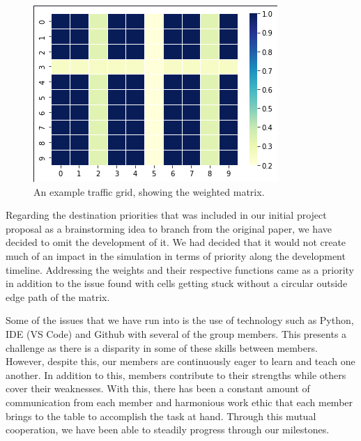 \documentclass[sigplan,screen]{acmart}
\begin{document}
\begin{figure}[h]
    \centering
    \includegraphics[width=\columnwidth]{assets/wmatrix.png}
    \caption{An example traffic grid, showing the weighted matrix.}
    \label{fig:wmatrix}
\end{figure}

Regarding the destination priorities that was included in our initial project
proposal as a brainstorming idea to branch from the original paper, we have
decided to omit the development of it. We had decided that it would not create
much of an impact in the simulation in terms of priority along the development
timeline. Addressing the weights and their respective functions came as a
priority in addition to the issue found with cells getting stuck without a
circular outside edge path of the matrix.

Some of the issues that we have run into is the use of technology such as
Python, IDE (VS Code) and Github with several of the group members. This
presents a challenge as there is a disparity in some of these skills between
members. However, despite this, our members are continuously eager to learn and
teach one another. In addition to this, members contribute to their strengths
while others cover their weaknesses. With this, there has been a constant amount
of communication from each member and harmonious work ethic that each member
brings to the table to accomplish the task at hand. Through this mutual
cooperation, we have been able to steadily progress through our milestones.
\end{document}
